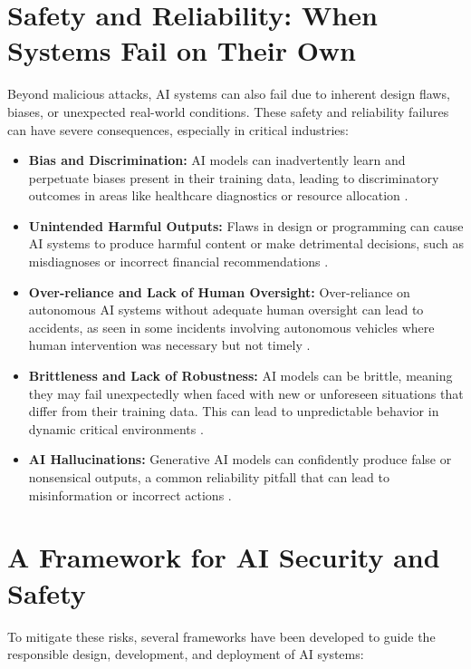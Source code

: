 \section{Safety and Reliability: When Systems Fail on Their Own}
\label{sec:safety_and_reliability}
Beyond malicious attacks, AI systems can also fail due to inherent design flaws, biases, or unexpected real-world conditions. These safety and reliability failures can have severe consequences, especially in critical industries:

\begin{itemize}
    \item \textbf{Bias and Discrimination:} AI models can inadvertently learn and perpetuate biases present in their training data, leading to discriminatory outcomes in areas like healthcare diagnostics or resource allocation \parencite{Ataccama2024}.
    \item \textbf{Unintended Harmful Outputs:} Flaws in design or programming can cause AI systems to produce harmful content or make detrimental decisions, such as misdiagnoses or incorrect financial recommendations \parencite{ActiveFence2023}.
    \item \textbf{Over-reliance and Lack of Human Oversight:} Over-reliance on autonomous AI systems without adequate human oversight can lead to accidents, as seen in some incidents involving autonomous vehicles where human intervention was necessary but not timely \parencite{Obeisun2025}.
    \item \textbf{Brittleness and Lack of Robustness:} AI models can be brittle, meaning they may fail unexpectedly when faced with new or unforeseen situations that differ from their training data. This can lead to unpredictable behavior in dynamic critical environments \parencite{Tigera2023}.
    \item \textbf{AI Hallucinations:} Generative AI models can confidently produce false or nonsensical outputs, a common reliability pitfall that can lead to misinformation or incorrect actions \parencite{MonteCarloData2023}.
\end{itemize}

\section{A Framework for AI Security and Safety}
\label{sec:security_framework}
To mitigate these risks, several frameworks have been developed to guide the responsible design, development, and deployment of AI systems:

